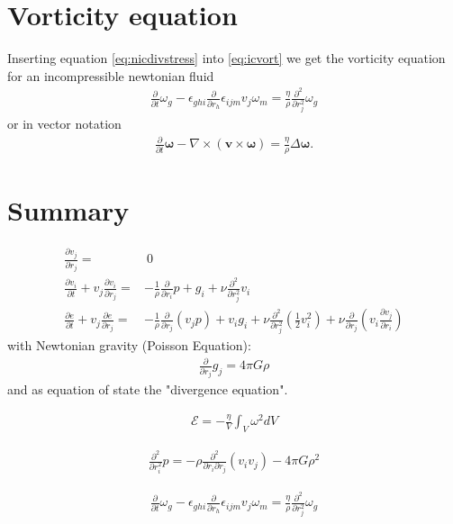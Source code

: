 \documentclass[a4paper,
					12pt,
					twoside,
					pagesize,
					cleardoubleplain,
					headsepline,
					bibtotoc
					]{scrbook}
\renewcommand{\vec}[1]{\boldsymbol{#1}}
\newcommand{\lra}[1]{{ \left( #1 \right) }}
\newcommand{\pd}[1]{\frac{\partial}{\partial #1}}
\newcommand{\ppd}[2]{\frac{\partial #2}{\partial #1}}
\newcommand{\pdd}[1]{\frac{\partial^2}{\partial #1^2}}
\begin{document}
\section{Vorticity equation}
Inserting equation \eqref{eq:nicdivstress} into \ref{eq:icvort}
we get the vorticity equation for an incompressible newtonian fluid
\begin{align}
\pd{t}\omega_g
-\epsilon_{ghi}\pd{r_h} \epsilon_{ijm} v_j \omega_m =
\frac{\eta}{\rho}\pdd{r_j}\omega_g
\end{align}
or in vector notation
\begin{align}
\pd{t} \vec{\omega}-\nabla \times (\vec{v} \times \vec{\omega}) = 
\frac{\eta}{\rho} \Delta \vec{\omega}.
\end{align}

\section{Summary}

\begin{align}
\ppd{r_j}{v_j} =&\ 0\\
\ppd{t}{v_i} + v_j \ppd{r_j}{v_i} =& -\frac{1}{\rho}\pd{r_i}p + g_i
+\nu\pdd{r_j}v_i\\
\ppd{t}{e} + v_j \ppd{r_j}{e} =& -\frac{1}{\rho} \pd{r_j}(v_j p) + v_i g_i
+\nu \pdd{r_j}\lra{\frac{1}{2}v_i^2}+ \nu \pd{r_j}\lra{v_i\ppd{r_i}{v_j}}
\end{align}
with Newtonian gravity (Poisson Equation):
\begin{align}
\pd{r_j}g_j=4\pi G \rho
\end{align}
and as equation of state the "divergence equation".

\begin{align}
\mathcal{E} = -\frac{\eta}{V} \int_V  \omega^2 dV
\label{eq:nicdiss}
\end{align}

\begin{align}
\pdd{r_i}p= 
-\rho \frac{\partial^2}{\partial r_i \partial r_j}(v_i v_j)
-4\pi G \rho^2
\end{align}

\begin{align}
\pd{t}\omega_g
-\epsilon_{ghi}\pd{r_h} \epsilon_{ijm} v_j \omega_m =
\frac{\eta}{\rho}\pdd{r_j}\omega_g
\end{align}
\end{document}
